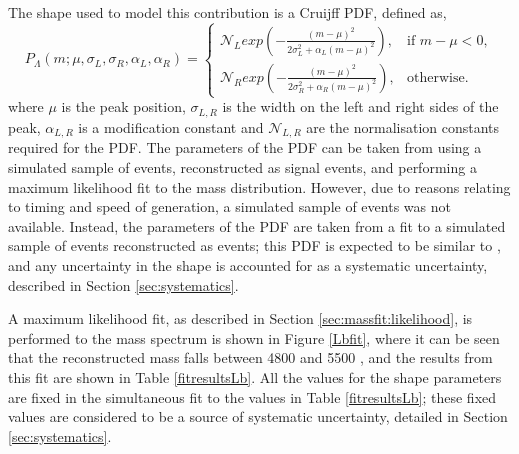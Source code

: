The shape used to model this  contribution is a Cruijff PDF, defined as,
\begin{equation}
  P_{\Lambda}(m; \mu,\sigma_L,\sigma_R,\alpha_L,\alpha_R)=
\begin{cases}
    \mathcal{N}_{L} exp \left( -\frac{(m-\mu)^2}{2\sigma_L^2 + \alpha_L(m-\mu)^2} \right) ,     & \text{if } m-\mu < 0, \\
    \mathcal{N}_{R} exp \left( -\frac{(m-\mu)^2}{2\sigma_R^2 + \alpha_R(m-\mu)^2} \right) ,     & \text{otherwise.}
\end{cases}
\label{Cruijff}
\end{equation}%
where $\mu$ is the peak position, $\sigma_{L,R}$ is the width on the left and right sides of the peak, $\alpha_{L,R}$ is a modification constant and $\mathcal{N}_{L,R}$ are the normalisation constants required for the PDF. The parameters of the PDF can be taken from using a simulated sample of  events, reconstructed as \decay{\Bm}{\D\Kstarm} signal events, and performing a maximum likelihood fit to the \Bm mass distribution. However, due to reasons relating to timing and speed of generation, a simulated sample of  events was not available. Instead, the parameters of the PDF are taken from a fit to a simulated sample of \decay{\Lb}{\Lc\Km} events reconstructed as \decay{\Bm}{\D\Km} events; this PDF is expected to be similar to , and any uncertainty in the shape is accounted for as a systematic uncertainty, described in Section \ref{sec:systematics}.

A maximum likelihood fit, as described in Section \ref{sec:massfit:likelihood}, is performed to the \Bm mass spectrum is shown in Figure \ref{Lbfit}, where it can be seen that the reconstructed \Bm mass falls between 4800 and 5500 \mevcc, and the results from this fit are shown in Table \ref{fitresultsLb}. All the values for the shape parameters are fixed in the simultaneous fit to the values in Table \ref{fitresultsLb}; these fixed values are considered to be a source of systematic uncertainty, detailed in Section \ref{sec:systematics}. 

